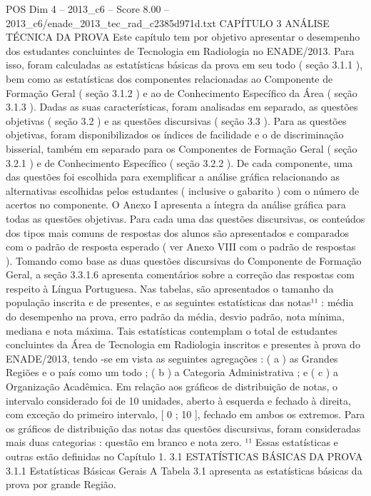 \begin{textsample}{POS Dim 4 – 2013\_c6 – Score 8.00 – 2013\_c6/enade\_2013\_tec\_rad\_c2385d971d.txt}  \label{ex:f4_pos_045}
CAPÍTULO 3 ANÁLISE TÉCNICA DA PROVA Este capítulo tem por objetivo apresentar o desempenho dos estudantes concluintes de Tecnologia em Radiologia no ENADE/2013.
Para isso, foram calculadas as estatísticas básicas da prova em seu todo ( seção 3.1.1 ), bem como as estatísticas dos componentes relacionadas ao Componente de Formação Geral ( seção 3.1.2 ) e ao de Conhecimento Específico da Área ( seção 3.1.3 ).
Dadas as suas características, foram analisadas em separado, as questões objetivas ( seção 3.2 ) e as questões discursivas ( seção 3.3 ).
Para as questões objetivas, foram disponibilizados os índices de facilidade e o de discriminação bisserial, também em separado para os Componentes de Formação Geral ( seção 3.2.1 ) e de Conhecimento Específico ( seção 3.2.2 ).
De cada componente, uma das questões foi escolhida para exemplificar a análise gráfica relacionando as alternativas escolhidas pelos estudantes ( inclusive o gabarito ) com o número de acertos no componente.
O Anexo I apresenta a íntegra da análise gráfica para todas as questões objetivas.
Para cada uma das questões discursivas, os conteúdos dos tipos mais comuns de respostas dos alunos são apresentados e comparados com o padrão de resposta esperado ( ver Anexo VIII com o padrão de respostas ).
Tomando como base as duas questões discursivas do Componente de Formação Geral, a seção 3.3.1.6 apresenta comentários sobre a correção das respostas com respeito à Língua Portuguesa.
Nas tabelas, são apresentados o tamanho da população inscrita e de presentes, e as seguintes estatísticas das notas¹¹ : média do desempenho na prova, erro padrão da média, desvio padrão, nota mínima, mediana e nota máxima.
Tais estatísticas contemplam o total de estudantes concluintes da Área de Tecnologia em Radiologia inscritos e presentes à prova do ENADE/2013, tendo -se em vista as seguintes agregações : ( a ) as Grandes Regiões e o país como um todo ; ( b ) a Categoria Administrativa ; e ( c ) a Organização Acadêmica.
Em relação aos gráficos de distribuição de notas, o intervalo considerado foi de 10 unidades, aberto à esquerda e fechado à direita, com exceção do primeiro intervalo, [ 0 ; 10 ], fechado em ambos os extremos.
Para os gráficos de distribuição das notas das questões discursivas, foram consideradas mais duas categorias : questão em branco e nota zero. ¹¹ Essas estatísticas e outras estão definidas no Capítulo 1. 3.1 ESTATÍSTICAS BÁSICAS DA PROVA 3.1.1 Estatísticas Básicas Gerais A Tabela 3.1 apresenta as estatísticas básicas da prova por grande Região.

\end{textsample}
